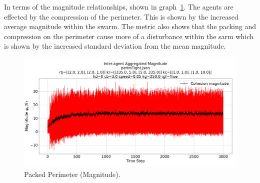 \documentclass[12pt,a4paper]{IEEEtran}
\begin{document}
In terms of the magnitude relationships, shown in graph~\ref{fig:tightPerimMagnitude}. The agents are effected by the compression of the perimeter. This is shown by the increased average magnitude within the swarm. The metric also shows that the packing and compression on the perimeter cause more of a disturbance within the sarm which is shown by the increased standard deviation from the mean magnitude.

\begin{figure}[H]
	\begin{center}
		\includegraphics[width=1.0\linewidth]{figures/tightPerimMagnitude}
	\end{center}
	\caption{Packed Perimeter (Magnitude). \label{fig:tightPerimMagnitude}}
\end{figure}



\end{document}
